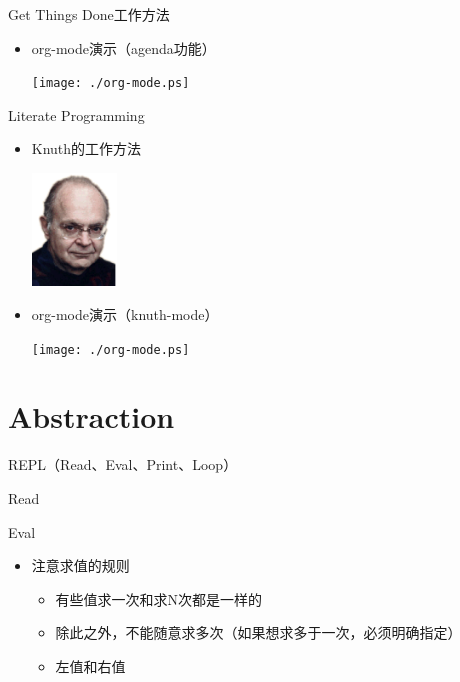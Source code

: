 \documentclass[presentation,dvipdfmx,CJKbookmarks]{beamer}
\begin{document}
\begin{CJK*}{UTF8}{simsun}
\begin{frame}[label={sec:orgc429e7c}]{Get Things Done\thinspace 工作方法}
\begin{itemize}
\item org-mode\thinspace 演示（agenda\thinspace 功能）

\begin{center}
\texttt{[image: ./org-mode.ps]}
\end{center}
\end{itemize}
\end{frame}

\begin{frame}[label={sec:org12ae752}]{Literate Programming}
\begin{itemize}
\item Knuth\thinspace 的工作方法

\begin{center}
\includegraphics[height=3cm]{./knuth.ps}
\end{center}

\item org-mode\thinspace 演示（knuth-mode）

\begin{center}
\texttt{[image: ./org-mode.ps]}
\end{center}
\end{itemize}
\end{frame}

\section{Abstraction}
\label{sec:orgaa436a3}

\begin{frame}[label={sec:org4d6b9fc}]{REPL（Read、Eval、Print、Loop）}
\begin{block}{Read}
\end{block}
\begin{block}{Eval}
\begin{itemize}
\item 注意求值的规则
\begin{itemize}
\item 有些值求一次和求\thinspace N\thinspace 次都是一样的
\item 除此之外，不能随意求多次（如果想求多于一次，必须明确指定）
\item 左值和右值
\end{itemize}
\end{itemize}
\end{block}


\end{frame}
\end{CJK*}
\end{document}
